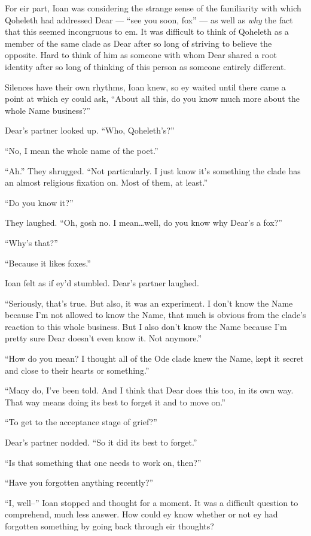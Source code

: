 For eir part, Ioan was considering the strange sense of the familiarity with which Qoheleth had addressed Dear — ``see you soon, fox'' — as well as \emph{why} the fact that this seemed incongruous to em. It was difficult to think of Qoheleth as a member of the same clade as Dear after so long of striving to believe the opposite. Hard to think of him as someone with whom Dear shared a root identity after so long of thinking of this person as someone entirely different.

Silences have their own rhythms, Ioan knew, so ey waited until there came a point at which ey could ask, ``About all this, do you know much more about the whole Name business?''

Dear's partner looked up. ``Who, Qoheleth's?''

``No, I mean the whole name of the poet.''

``Ah.'' They shrugged. ``Not particularly. I just know it's something the clade has an almost religious fixation on. Most of them, at least.''

``Do you know it?''

They laughed. ``Oh, gosh no. I mean\ldots{}well, do you know why Dear's a fox?''

``Why's that?''

``Because it likes foxes.''

Ioan felt as if ey'd stumbled. Dear's partner laughed.

``Seriously, that's true. But also, it was an experiment. I don't know the Name because I'm not allowed to know the Name, that much is obvious from the clade's reaction to this whole business. But I also don't know the Name because I'm pretty sure Dear doesn't even know it. Not anymore.''

``How do you mean? I thought all of the Ode clade knew the Name, kept it secret and close to their hearts or something.''

``Many do, I've been told. And I think that Dear does this too, in its own way. That way means doing its best to forget it and to move on.''

``To get to the acceptance stage of grief?''

Dear's partner nodded. ``So it did its best to forget.''

``Is that something that one needs to work on, then?''

``Have you forgotten anything recently?''

``I, well--'' Ioan stopped and thought for a moment. It was a difficult question to comprehend, much less answer. How could ey know whether or not ey had forgotten something by going back through eir thoughts?

